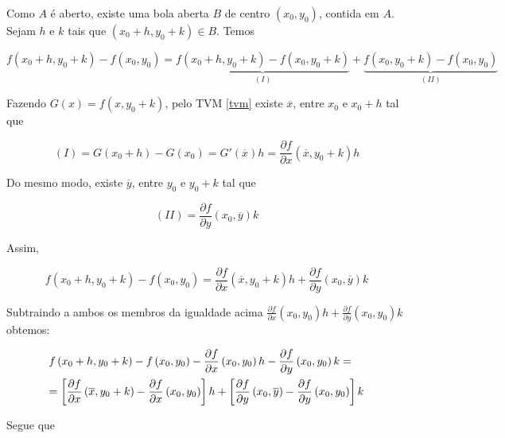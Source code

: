 \documentclass{book}
\begin{document}
\begin{dem}
    Como $A$ \'e aberto, existe uma bola aberta $B$ de centro $\left( {x_0 ,y_0 } \right)$, contida em $A$. Sejam $h$ e $k$ tais que $\left( {x_0  + h,y_0  + k} \right) \in B$. Temos

\[
\scriptstyle{f\left( {x_0  + h,y_0  + k} \right) - f\left( {x_0 ,y_0 } \right) = \underbrace {f\left( {x_0  + h,y_0  + k} \right) - f\left( {x_0 ,y_0  + k} \right)}_{\left( I \right)} + \underbrace {f\left( {x_0 ,y_0  + k} \right) - f\left( {x_0 ,y_0 } \right)}_{\left( {II} \right)}}
\]

    Fazendo $G\left( x \right) = f\left( {x,y_0  + k} \right)$, pelo TVM \ref{tvm} existe $\overline x$, entre $x_0$ e $x_0 + h$ tal que

\[
\left( I \right) = G\left( {x_0  + h} \right) - G\left( {x_0 } \right) = G'\left( {\overline x } \right)h = \frac{{\partial f}}
{{\partial x}}\left( {\overline x ,y_0  + k} \right)h
\]

Do mesmo modo, existe $\overline y$, entre $y_0$ e $y_0 + k$ tal que

\[
    \left( {II} \right) = \frac{{\partial f}}{{\partial y}}\left( {x_0 ,\overline y } \right)k
\]

Assim,

\[
f\left( {x_0  + h,y_0  + k} \right) - f\left( {x_0 ,y_0 } \right) = \frac{{\partial f}}
{{\partial x}}\left( {\overline x ,y_0  + k} \right)h + \frac{{\partial f}}
{{\partial y}}\left( {x_0 ,\overline y } \right)k
\]

    Subtraindo a ambos os membros da igualdade acima $\frac{{\partial f}}{{\partial x}}\left( {x_0 ,y_0 } \right)h + \frac{{\partial f}}{{\partial y}}\left( {x_0 ,y_0 } \right)k$ obtemos:

\[
\begin{gathered}
  f\left( {x_0  + h,y_0  + k} \right) - f\left( {x_0 ,y_0 } \right) - \frac{{\partial f}}
{{\partial x}}\left( {x_0 ,y_0 } \right)h - \frac{{\partial f}}
{{\partial y}}\left( {x_0 ,y_0 } \right)k =  \hfill \\
= \left[ {\frac{{\partial f}}
{{\partial x}}\left( {\overline x ,y_0  + k} \right) - \frac{{\partial f}}
{{\partial x}}\left( {x_0 ,y_0 } \right)} \right]h + \left[ {\frac{{\partial f}}
{{\partial y}}\left( {x_0 ,\overline y } \right) - \frac{{\partial f}}
{{\partial y}}\left( {x_0 ,y_0 } \right)} \right]k \hfill \\
\end{gathered}
\]

Segue que


\end{dem}
\end{document}
